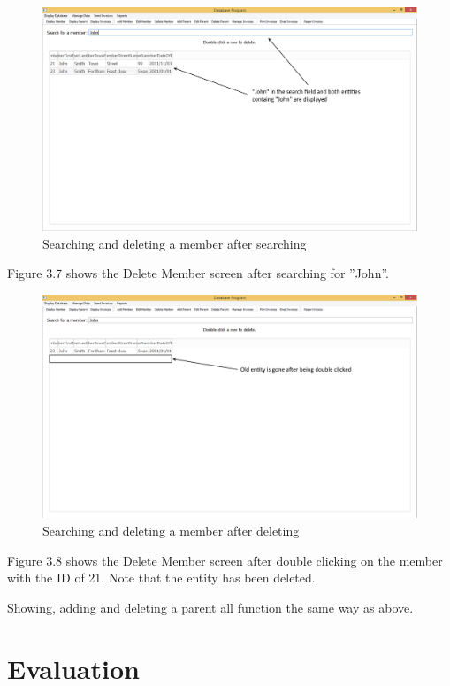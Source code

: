 \begin{figure}[H]
\includegraphics[width=\textwidth]{./Testing/Images/DeleteMember2.png}
    \caption{Searching and deleting a member after searching} \label{fig:delete_member_2}
\end{figure}

Figure 3.7 shows the Delete Member screen after searching for ''John''.


\begin{figure}[H]
\includegraphics[width=\textwidth]{./Testing/Images/DeleteMember3.png}
    \caption{Searching and deleting a member after deleting} \label{fig:delete_member_3}
\end{figure}

Figure 3.8 shows the Delete Member screen after double clicking on the member with the ID of 21. Note that the entity has been deleted.

Showing, adding and deleting a parent all function the same way as above.


\section{Evaluation}

